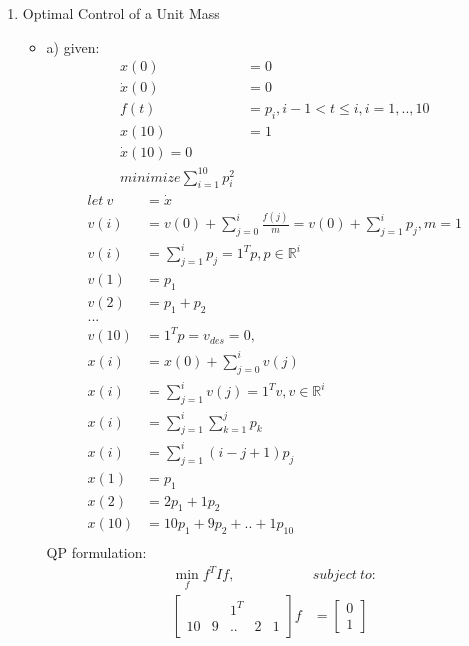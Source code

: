 \documentclass[12pt,letter]{article}
\newcommand{\R}{\mathbb{R}}
\begin{document}
\begin{enumerate}
\item Optimal Control of a Unit Mass
  \begin{itemize}
  \item a) given:
    \begin{align*}
      x(0)&=0\\
      \dot{x}(0)&=0\\
      f(t)&=p_i, i-1 < t \leq i, i=1,..,10\\
      x(10)&=1\\
      \dot{x}(10)=0\\
      minimize \sum_{i=1}^{10} p_i^2
    \end{align*}
    \begin{align*}
      let\ v &= \dot{x}\\ 
      v(i) &= v(0) + \sum_{j=0}^i \frac{f(j)}{m} = v(0) + \sum_{j=1}^i p_j, m=1\\
      v(i) &= \sum_{j=1}^i p_j = 1^T p, p \in \R^{i}\\
      v(1) &= p_1\\
      v(2) &= p_1 + p_2\\
      ...\\
      v(10) &= 1^T p = v_{des} = 0,\\
      x(i) &= x(0) + \sum_{j=0}^i v(j)\\
      x(i) &= \sum_{j=1}^i v(j) = 1^T v, v \in \R^{i}\\
      x(i) &= \sum_{j=1}^i \sum_{k=1}^j p_k\\
      x(i) &= \sum_{j=1}^i (i-j+1) p_j\\
      x(1) &= p_1\\
      x(2) &= 2 p_1 + 1p_2\\
      x(10) &= 10 p_1 + 9p_2 + .. + 1p_{10}\\
    \end{align*}
    QP formulation:
    \begin{align*}
      \min_{f} f^TIf,\ &subject\ to:\\
      \begin{bmatrix}
        & & 1^T & & \\
        10 & 9 & .. & 2 & 1
      \end{bmatrix} f &=
      \begin{bmatrix}
        0\\
        1
      \end{bmatrix}\\

\end{align*}
\end{itemize}
\end{enumerate}
\end{document}
